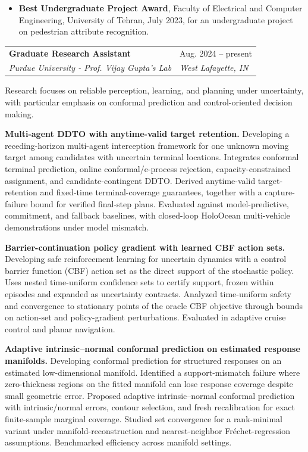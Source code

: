 \documentclass[letterpaper,10pt]{article}
\makeatletter
\newcommand{\cvsection}[1]{%
  \Needspace{4\baselineskip}%
  \par\addvspace{11pt}%
  \noindent\marginpar{\vspace{1pt}\RaggedRight\small\scshape #1}%
  \ignorespaces
}
\newcommand{\datedentry}[4]{%
  \Needspace{3\baselineskip}%
  \noindent\begin{tabularx}{\linewidth}{@{}X >{\raggedleft\arraybackslash}p{1.55in}@{}}
    \textbf{#1} & #2\\[-1pt]
    \textit{#3} & \textit{#4}
  \end{tabularx}\par\vspace{3pt}%
}
\newcommand{\researchtopic}[2]{%
  \Needspace{8\baselineskip}%
  \par\vspace{3pt}\noindent\textbf{#1} #2\par
}
\makeatother
\begin{document}
\cvsection{Honors and\\Awards}
\begin{itemize}
  \item \textbf{Best Undergraduate Project Award}, Faculty of Electrical and Computer Engineering, University of Tehran, July 2023, for an undergraduate project on pedestrian attribute recognition.
\end{itemize}

\cvsection{Research and\\Experience}
\datedentry{Graduate Research Assistant}{Aug. 2024 -- present}{Purdue University - Prof. Vijay Gupta's Lab}{West Lafayette, IN}
Research focuses on reliable perception, learning, and planning under uncertainty, with particular emphasis on conformal prediction and control-oriented decision making.

\researchtopic{Multi-agent DDTO with anytime-valid target retention.}{Developing a receding-horizon multi-agent interception framework for one unknown moving target among candidates with uncertain terminal locations. Integrates conformal terminal prediction, online conformal/e-process rejection, capacity-constrained assignment, and candidate-contingent DDTO. Derived anytime-valid target-retention and fixed-time terminal-coverage guarantees, together with a capture-failure bound for verified final-step plans. Evaluated against model-predictive, commitment, and fallback baselines, with closed-loop HoloOcean multi-vehicle demonstrations under model mismatch.}

\researchtopic{Barrier-continuation policy gradient with learned CBF action sets.}{Developing safe reinforcement learning for uncertain dynamics with a control barrier function (CBF) action set as the direct support of the stochastic policy. Uses nested time-uniform confidence sets to certify support, frozen within episodes and expanded as uncertainty contracts. Analyzed time-uniform safety and convergence to stationary points of the oracle CBF objective through bounds on action-set and policy-gradient perturbations. Evaluated in adaptive cruise control and planar navigation.}

\newpage
\cvsection{Research and\\Experience\\(continued)}
\researchtopic{Adaptive intrinsic--normal conformal prediction on estimated response manifolds.}{Developing conformal prediction for structured responses on an estimated low-dimensional manifold. Identified a support-mismatch failure where zero-thickness regions on the fitted manifold can lose response coverage despite small geometric error. Proposed adaptive intrinsic--normal conformal prediction with intrinsic/normal errors, contour selection, and fresh recalibration for exact finite-sample marginal coverage. Studied set convergence for a rank-minimal variant under manifold-reconstruction and nearest-neighbor Fr\'echet-regression assumptions. Benchmarked efficiency across manifold settings.}
\end{document}
